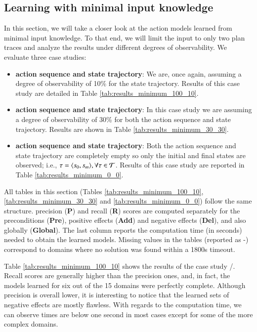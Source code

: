 \subsection{Learning with minimal input knowledge}
\label{minimal}


In this section, we will take a closer look at the action models learned from minimal input knowledge. To that end, we will limit the input to only two plan traces and analyze the results under different degrees of observability. We evaluate three case studies:

\begin{itemize}
	\item \textbf{\FO action sequence and \PO state trajectory}: We are, once again, assuming a degree of observability of 10\% for the state trajectory. Results of this case study are detailed in Table \ref{tab:results_minimum_100_10}.
	\item  \textbf{\PO action sequence and \PO state trajectory}: In this case study we are assuming a degree of observability of 30\% for both the action sequence and state trajectory. Results are shown in Table \ref{tab:results_minimum_30_30}.
	\item  \textbf{\NO action sequence and \NO state trajectory}: Both the action sequence and state trajectory are completely empty so only the initial and final states are observed; i.e., $\tau = {\langle s_0, s_m \rangle}, \forall \tau \in \mathcal{T}$. Results of this case study are reported in Table \ref{tab:results_minimum_0_0}.
\end{itemize}

All tables in this section (Tables \ref{tab:results_minimum_100_10}, \ref{tab:results_minimum_30_30} and \ref{tab:results_minimum_0_0}) follow the same structure. precision ({\bf P}) and recall ({\bf R}) scores are computed separately for the preconditions ({\bf Pre}), positive effects ({\bf Add}) and negative effects ({\bf Del}), and also globally ({\bf Global}). The last column reports the computation time (in seconds) needed to obtain the learned models. Missing values in the tables (reported as -) correspond to domains where no solution was found within a 1800s timeout.

Table \ref{tab:results_minimum_100_10} shows the results of the case study \FO/\PO. Recall scores are generally higher than the precision ones, and, in fact, the models learned for six out of the 15 domains were perfectly complete. Although precision is overall lower, it is interesting to notice that the learned sets of negative effects are mostly flawless. With regards to the computation time, we can observe times are below one second in most cases except for some of the more complex domains.


